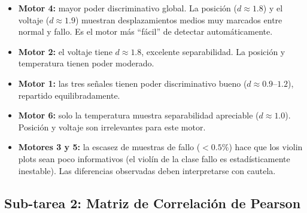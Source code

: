 \documentclass[12pt,a4paper]{article}
\begin{document}
\begin{itemize}[leftmargin=2em]
  \item \textbf{Motor 4:} mayor poder discriminativo global. La posición ($d \approx 1.8$)
    y el voltaje ($d \approx 1.9$) muestran desplazamientos medios muy marcados entre
    normal y fallo. Es el motor más ``fácil'' de detectar automáticamente.

  \item \textbf{Motor 2:} el voltaje tiene $d \approx 1.8$, excelente separabilidad.
    La posición y temperatura tienen poder moderado.

  \item \textbf{Motor 1:} las tres señales tienen poder discriminativo bueno
    ($d \approx 0.9$--$1.2$), repartido equilibradamente.

  \item \textbf{Motor 6:} solo la temperatura muestra separabilidad apreciable
    ($d \approx 1.0$). Posición y voltaje son irrelevantes para este motor.

  \item \textbf{Motores 3 y 5:} la escasez de muestras de fallo ($< 0.5\%$) hace
    que los violin plots sean poco informativos (el violín de la clase fallo es
    estadísticamente inestable). Las diferencias observadas deben interpretarse
    con cautela.
\end{itemize}

\subsection{Sub-tarea 2: Matriz de Correlación de Pearson}
\end{document}

